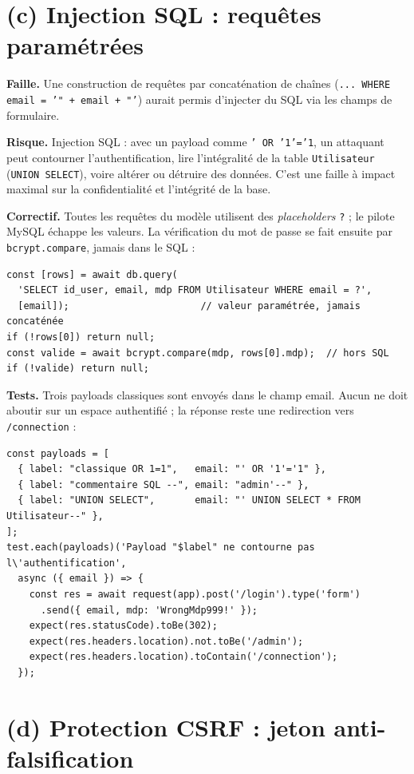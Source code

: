 \documentclass[12pt,a4paper]{article}
\begin{document}
\section{(c) Injection SQL : requêtes paramétrées}

\textbf{Faille.} Une construction de requêtes par concaténation de chaînes (\texttt{... WHERE email = '" + email + "'}) aurait permis d'injecter du SQL via les champs de formulaire.

\textbf{Risque.} Injection SQL : avec un payload comme \texttt{' OR '1'='1}, un attaquant peut contourner l'authentification, lire l'intégralité de la table \texttt{Utilisateur} (\texttt{UNION SELECT}), voire altérer ou détruire des données. C'est une faille à impact maximal sur la confidentialité et l'intégrité de la base.

\textbf{Correctif.} Toutes les requêtes du modèle utilisent des \textit{placeholders} \texttt{?} ; le pilote MySQL échappe les valeurs. La vérification du mot de passe se fait ensuite par \texttt{bcrypt.compare}, jamais dans le SQL :

\begin{lstlisting}
const [rows] = await db.query(
  'SELECT id_user, email, mdp FROM Utilisateur WHERE email = ?',
  [email]);                       // valeur paramétrée, jamais concaténée
if (!rows[0]) return null;
const valide = await bcrypt.compare(mdp, rows[0].mdp);  // hors SQL
if (!valide) return null;
\end{lstlisting}

\textbf{Tests.} Trois payloads classiques sont envoyés dans le champ email. Aucun ne doit aboutir sur un espace authentifié ; la réponse reste une redirection vers \texttt{/connection} :

\begin{lstlisting}
const payloads = [
  { label: "classique OR 1=1",   email: "' OR '1'='1" },
  { label: "commentaire SQL --", email: "admin'--" },
  { label: "UNION SELECT",       email: "' UNION SELECT * FROM Utilisateur--" },
];
test.each(payloads)('Payload "$label" ne contourne pas l\'authentification',
  async ({ email }) => {
    const res = await request(app).post('/login').type('form')
      .send({ email, mdp: 'WrongMdp999!' });
    expect(res.statusCode).toBe(302);
    expect(res.headers.location).not.toBe('/admin');
    expect(res.headers.location).toContain('/connection');
  });
\end{lstlisting}

\section{(d) Protection CSRF : jeton anti-falsification}
\end{document}
